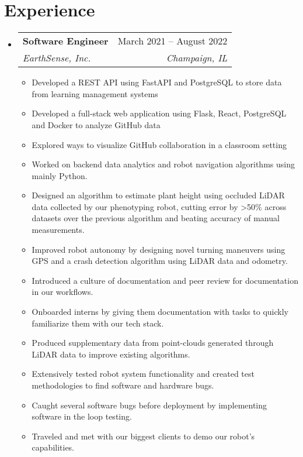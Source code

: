 \documentclass[letterpaper,11pt]{article}
\makeatletter
\newcommand{\resumeItem}[1]{
  \item\small{
    {#1 \vspace{-2pt}}
  }
}
\newcommand{\resumeSubheading}[4]{
  \vspace{-2pt}\item
    \begin{tabular*}{0.97\textwidth}[t]{l@{\extracolsep{\fill}}r}
      \textbf{#1} & #2 \\
      \textit{\small#3} & \textit{\small #4} \\
    \end{tabular*}\vspace{-7pt}
}
\newcommand{\resumeSubSubheading}[2]{
    \item
    \begin{tabular*}{0.97\textwidth}{l@{\extracolsep{\fill}}r}
      \textit{\small#1} & \textit{\small #2} \\
    \end{tabular*}\vspace{-7pt}
}
\newcommand{\resumeSubHeadingListStart}
{\begin{itemize}[leftmargin=0.15in, label={}]}
\newcommand{\resumeSubHeadingListEnd}{\end{itemize}}
\newcommand{\resumeItemListStart}{\begin{itemize}}
\newcommand{\resumeItemListEnd}{\end{itemize}\vspace{-5pt}}
\makeatother
\begin{document}
\section{Experience}
\resumeSubHeadingListStart

\resumeSubheading
{Software Engineer}{March 2021 -- August 2022}
{EarthSense, Inc.}{Champaign, IL}
\resumeItemListStart
\resumeItem{Developed a REST API using FastAPI and PostgreSQL to store data from learning management systems}
\resumeItem{Developed a full-stack web application using Flask, React, PostgreSQL and Docker to analyze GitHub data}
\resumeItem{Explored ways to visualize GitHub collaboration in a classroom setting}
\resumeItem{Worked on backend data analytics and robot navigation algorithms using mainly Python.}
\resumeItem{Designed an algorithm to estimate plant height using occluded LiDAR data collected by our phenotyping robot, cutting error by >50\% across datasets over the previous algorithm and beating accuracy of manual measurements.}
\resumeItem{Improved robot autonomy by designing novel turning maneuvers using GPS and a crash detection algorithm using LiDAR data and odometry. }
\resumeItem{Introduced a culture of documentation and peer review for documentation in our workflows.}
\resumeItem{Onboarded interns by giving them documentation with tasks to quickly familiarize them with our tech stack.}
\resumeItem{Produced supplementary data from point-clouds generated through LiDAR data to improve existing algorithms.}
\resumeItem{Extensively tested robot system functionality and created test methodologies to find software and hardware bugs.}
\resumeItem{Caught several software bugs before deployment by implementing software in the loop testing.}
\resumeItem{Traveled and met with our biggest clients to demo our robot's capabilities.}

\resumeItemListEnd


\resumeSubHeadingListEnd


\end{document}
